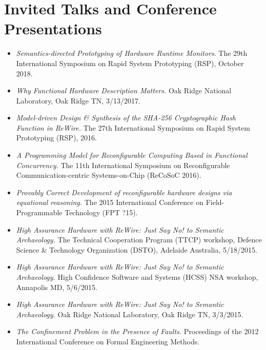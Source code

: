 \documentclass[11pt]{article}
\begin{document}
\section{Invited Talks and Conference Presentations}

\begin{itemize}[leftmargin=0mm]

\item[]{\it Semantics-directed Prototyping of Hardware Runtime Monitors}. The 29th International Symposium on Rapid System Prototyping (RSP), October 2018.

\item[]{\it Why Functional Hardware Description Matters.}
Oak Ridge National Laboratory, Oak Ridge TN, 3/13/2017.


\item[]{\it Model-driven Design \& Synthesis of the SHA-256 Cryptographic Hash Function in ReWire.} The 27th International Symposium on Rapid System Prototyping (RSP), 2016.

\item[]{\it A Programming Model for Reconfigurable Computing Based in Functional Concurrency.} The 11th International Symposium on Reconfigurable Communication-centric Systems-on-Chip (ReCoSoC 2016).

\item[]{\it Provably Correct Development of reconfigurable hardware designs via equational reasoning.} The 2015 International Conference on Field-Programmable Technology (FPT ?15).

\item[]{\it High Assurance Hardware with ReWire: Just Say No! to Semantic Archaeology.}
The Technical Cooperation Program (TTCP) workshop, Defence Science \& Technology Organization (DSTO), Adelaide Australia, 5/18/2015.

\item[]{\it High Assurance Hardware with ReWire: Just Say No! to Semantic Archaeology.}
High Confidence Software and Systems (HCSS) NSA workshop, Annapolis MD, 5/6/2015.

\item[]{\it High Assurance Hardware with ReWire: Just Say No! to Semantic Archaeology.}
Oak Ridge National Laboratory, Oak Ridge TN, 3/3/2015.

\item[]{\it The Confinement Problem in the Presence of Faults.} Proceedings of the 2012 International Conference on Formal Engineering Methods.


\end{itemize}
\end{document}
